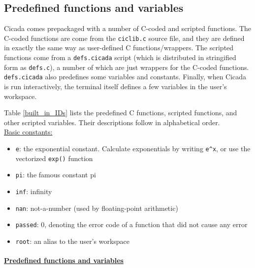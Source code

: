\documentclass{article}
\begin{document}
\subsection{Predefined functions and variables}

Cicada comes prepackaged with a number of C-coded and scripted functions.  The C-coded functions are come from the \verb#ciclib.c# source file, and they are defined in exactly the same way as user-defined C functions/wrappers.  The scripted functions come from a \verb#defs.cicada# script (which is distributed in stringified form as \verb#defs.c#), a number of which are just wrappers for the C-coded functions.  \verb#defs.cicada# also predefines some variables and constants.  Finally, when Cicada is run interactively, the terminal itself defines a few variables in the user's workspace.

Table \ref{built_in_IDs} lists the predefined C functions, scripted functions, and other scripted variables.  Their descriptions follow in alphabetical order.\\

\noindent \underline{Basic constants:}
\begin{itemize}
\item \texttt{e}:  the exponential constant.  Calculate exponentials by writing \verb#e^x#, or use the vectorized \verb#exp()# function
\item \texttt{pi}:  the famous constant pi
\item \texttt{inf}:  infinity
\item \texttt{nan}:  not-a-number (used by floating-point arithmetic)
\item \texttt{passed}:  0, denoting the error code of a function that did not cause any error
\item \texttt{root}:  an alias to the user's workspace
\end{itemize}


\noindent \paragraph{\underline{Predefined functions and variables}}
\end{document}
